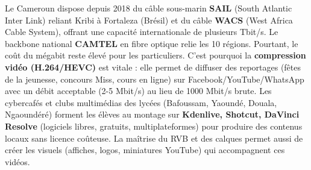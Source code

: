 \documentclass[11pt]{article}
\begin{document}
\begin{savaistu}
Le Cameroun dispose depuis 2018 du câble sous-marin \textbf{SAIL} (South Atlantic Inter Link) reliant Kribi à Fortaleza (Brésil) et du câble \textbf{WACS} (West Africa Cable System), offrant une capacité internationale de plusieurs Tbit/s. Le backbone national \textbf{CAMTEL} en fibre optique relie les 10 régions. Pourtant, le coût du mégabit reste élevé pour les particuliers. C'est pourquoi la \textbf{compression vidéo (H.264/HEVC)} est vitale : elle permet de diffuser des reportages (fêtes de la jeunesse, concours Miss, cours en ligne) sur Facebook/YouTube/WhatsApp avec un débit acceptable (2-5 Mbit/s) au lieu de 1000 Mbit/s brute. Les cybercafés et clubs multimédias des lycées (Bafoussam, Yaoundé, Douala, Ngaoundéré) forment les élèves au montage sur \textbf{Kdenlive, Shotcut, DaVinci Resolve} (logiciels libres, gratuits, multiplateformes) pour produire des contenus locaux sans licence coûteuse. La maîtrise du RVB et des calques permet aussi de créer les visuels (affiches, logos, miniatures YouTube) qui accompagnent ces vidéos.
\end{savaistu}
\end{document}
